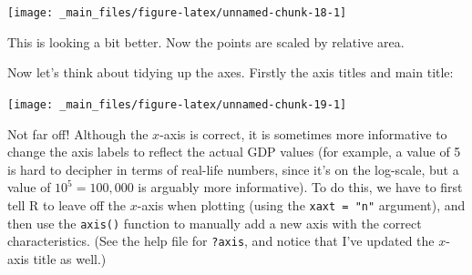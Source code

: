 \documentclass[]{book}
\newenvironment{Shaded}{\begin{snugshade}}{\end{snugshade}}
\newcommand{\KeywordTok}[1]{\textcolor[rgb]{0.13,0.29,0.53}{\textbf{{#1}}}}
\newcommand{\DataTypeTok}[1]{\textcolor[rgb]{0.13,0.29,0.53}{{#1}}}
\newcommand{\DecValTok}[1]{\textcolor[rgb]{0.00,0.00,0.81}{{#1}}}
\newcommand{\StringTok}[1]{\textcolor[rgb]{0.31,0.60,0.02}{{#1}}}
\newcommand{\NormalTok}[1]{{#1}}
\theoremstyle{definition}
\theoremstyle{definition}
\theoremstyle{definition}
\theoremstyle{remark}
\begin{document}
\begin{center}\texttt{[image: \_main\_files/figure-latex/unnamed-chunk-18-1]} \end{center}

This is looking a bit better. Now the points are scaled by relative
area.

Now let's think about tidying up the axes. Firstly the axis titles and
main title:

\begin{Shaded}
\end{Shaded}

\begin{center}\texttt{[image: \_main\_files/figure-latex/unnamed-chunk-19-1]} \end{center}

Not far off! Although the \(x\)-axis is correct, it is sometimes more
informative to change the axis labels to reflect the actual GDP values
(for example, a value of 5 is hard to decipher in terms of real-life
numbers, since it's on the log-scale, but a value of \(10^5 = 100,000\)
is arguably more informative). To do this, we have to first tell R to
leave off the \(x\)-axis when plotting (using the \texttt{xaxt\ =\ "n"}
argument), and then use the \texttt{axis()} function to manually add a
new axis with the correct characteristics. (See the help file for
\texttt{?axis}, and notice that I've updated the \(x\)-axis title as
well.)
\end{document}
